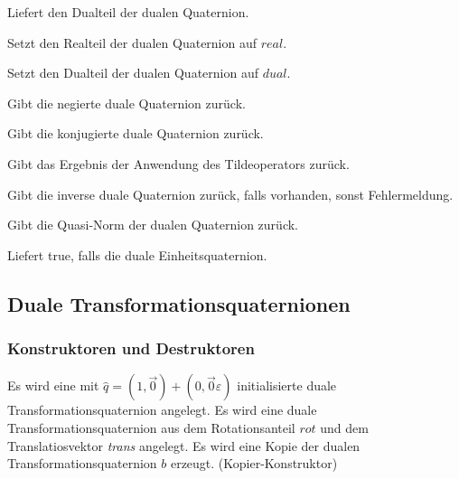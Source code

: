 		\descr
		{
			Liefert den Dualteil der dualen Quaternion.
		}
		
		\descr
		{
			Setzt den Realteil der dualen Quaternion auf $real$.
		}
		
		\descr
		{
			Setzt den Dualteil der dualen Quaternion auf $dual$.
		}
		
		\descr
		{
			Gibt die negierte duale Quaternion zurück.
		}
		
		\descr
		{
			Gibt die konjugierte duale Quaternion zurück.
		}
		
		\descr
		{
			Gibt das Ergebnis der Anwendung des Tildeoperators zurück.
		}
		
		\descr
		{
			Gibt die inverse duale Quaternion zurück, falls vorhanden, sonst Fehlermeldung.
		}
		
		\descr
		{
			Gibt die Quasi-Norm der dualen Quaternion zurück.
		}
		
		\descr
		{
			Liefert true, falls die duale Einheitsquaternion.
		}
\subsection{Duale Transformationsquaternionen}
\subsubsection{Konstruktoren und Destruktoren}
	\descr
	{
		Es wird eine mit $\hat{q}=(1,\vec{0})+(0,\vec{0}\varepsilon)$ initialisierte duale
		Transformationsquaternion angelegt.
	}
	\descr
	{
		Es wird eine duale Transformationsquaternion aus dem Rotationsanteil $rot$ und dem
		Translatiosvektor \textit{trans} angelegt.
	}
	\descr
	{
		Es wird eine Kopie der dualen Transformationsquaternion $b$ erzeugt.
		(Kopier-Konstruktor)
	}
	
